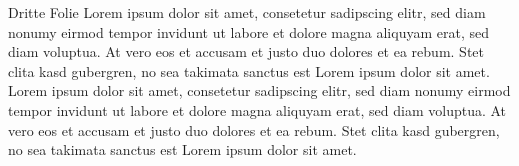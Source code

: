 \documentclass{beamer}
\begin{document}
\begin{frame}{Dritte Folie}
	Lorem ipsum dolor sit amet, consetetur sadipscing elitr, sed diam nonumy eirmod tempor invidunt ut labore et dolore magna aliquyam erat, sed diam voluptua. At vero eos et accusam et justo duo dolores et ea rebum. Stet clita kasd gubergren, no sea takimata sanctus est Lorem ipsum dolor sit amet. Lorem  ipsum dolor sit amet, consetetur sadipscing elitr, sed diam nonumy eirmod tempor invidunt ut labore et dolore magna aliquyam erat, sed diam voluptua. At vero eos et accusam et justo duo dolores et ea rebum. Stet clita kasd gubergren, no sea takimata sanctus est Lorem ipsum dolor sit amet.
\end{frame}
\end{document}

